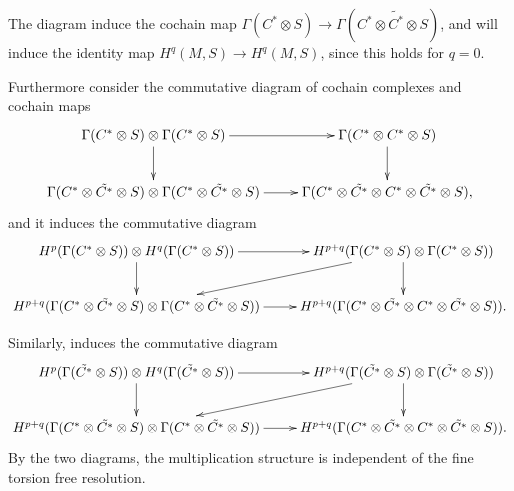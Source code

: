 \documentclass[twoside]{article}
\begin{document}
The diagram induce the cochain map $\Gamma(C^*\otimes S)\to \Gamma(C^*\otimes \tilde{C^*}\otimes S)$, and will induce the identity map $H^q(M,S)\to H^q(M,S)$, since this holds for $q=0$.

Furthermore consider the commutative diagram of cochain complexes and cochain maps
\begin{equation*}
\xymatrix{
\Gamma(C^*\otimes S)\otimes\Gamma(C^*\otimes S)\ar[r]\ar[d]&\Gamma(C^*\otimes C^*\otimes S)\ar[d]\\
\Gamma(C^*\otimes \tilde{C^*}\otimes S) \otimes \Gamma(C^*\otimes \tilde{C^*}\otimes S)\ar[r] & \Gamma(C^*\otimes \tilde{C^*}\otimes C^*\otimes \tilde{C^*}\otimes S),\\
}
\end{equation*}
 and it induces the commutative diagram \begin{equation*}
   \xymatrix{
   H^p(\Gamma(C^*\otimes S))\otimes H^q( \Gamma(C^*\otimes S))\ar[r]\ar[d]& H^{p+q}(\Gamma(C^*\otimes S)\otimes \Gamma(C^*\otimes S))\ar[d]\ar[dl]\\
   H^{p+q}(\Gamma(C^*\otimes \tilde{C^*}\otimes S) \otimes \Gamma(C^*\otimes \tilde{C^*}\otimes S))\ar[r]&H^{p+q}(\Gamma(C^*\otimes \tilde{C^*}\otimes C^*\otimes \tilde{C^*}\otimes S)).\\
   }
 \end{equation*}

Similarly, induces the commutative diagram
\begin{equation*}
   \xymatrix{
   H^p(\Gamma(\tilde{C^*}\otimes S))\otimes H^q(\Gamma(\tilde{C^*}\otimes S))\ar[r]\ar[d]& H^{p+q}(\Gamma(\tilde{C^*}\otimes S)\otimes \Gamma(\tilde{C^*}\otimes S))\ar[d]\ar[dl]\\
   H^{p+q}(\Gamma(C^*\otimes \tilde{C^*}\otimes S) \otimes \Gamma(C^*\otimes \tilde{C^*}\otimes S))\ar[r]&H^{p+q}(\Gamma(C^*\otimes \tilde{C^*}\otimes C^*\otimes \tilde{C^*}\otimes S)).\\
   }
 \end{equation*}
 By the two diagrams, the multiplication structure is independent of the fine torsion free resolution.
\nocite{*}
\printbibliography
\end{document}
